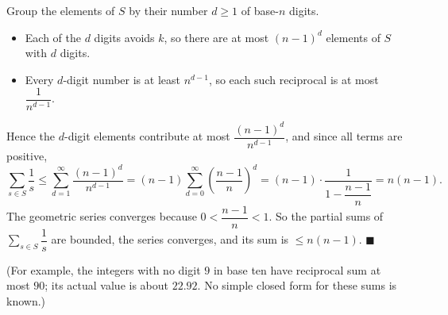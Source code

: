 Group the elements of $S$ by their number $d\ge1$ of base-$n$ digits.
\begin{itemize}
\item Each of the $d$ digits avoids $k$, so there are at most $(n-1)^d$ elements of $S$ with $d$ digits.
\item Every $d$-digit number is at least $n^{d-1}$, so each such reciprocal is at most $\dfrac1{n^{d-1}}$.
\end{itemize}
Hence the $d$-digit elements contribute at most $\dfrac{(n-1)^d}{n^{d-1}}$, and since all terms are positive,
\[\sum_{s\in S}\dfrac1s\le\sum_{d=1}^{\infty}\dfrac{(n-1)^d}{n^{d-1}}=(n-1)\sum_{d=0}^{\infty}\left(\dfrac{n-1}{n}\right)^d=(n-1)\cdot\dfrac{1}{1-\dfrac{n-1}{n}}=n(n-1).\]
The geometric series converges because $0<\dfrac{n-1}{n}<1$. So the partial sums of $\sum_{s\in S}\dfrac1s$ are bounded, the series converges, and its sum is $\boxed{\le n(n-1)}$. $\blacksquare$

(For example, the integers with no digit $9$ in base ten have reciprocal sum at most $90$; its actual value is about $22.92$. No simple closed form for these sums is known.)
